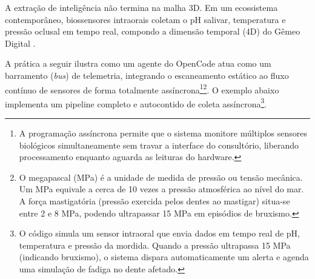 A extração de inteligência não termina na malha 3D. Em um ecossistema contemporâneo, biossensores intraorais coletam o pH salivar, temperatura e pressão oclusal em tempo real, compondo a dimensão temporal (4D) do Gêmeo Digital \cite{Khoshfekr2025}.

A prática a seguir ilustra como um agente do OpenCode atua como um barramento (\textit{bus}) de telemetria, integrando o escaneamento estático ao fluxo contínuo de sensores de forma totalmente assíncrona\footnote{A programação assíncrona permite que o sistema monitore múltiplos sensores biológicos simultaneamente sem travar a interface do consultório, liberando processamento enquanto aguarda as leituras do hardware.}\footnote{O megapascal (MPa) é a unidade de medida de pressão ou tensão mecânica. Um MPa equivale a cerca de 10 vezes a pressão atmosférica ao nível do mar. A força mastigatória (pressão exercida pelos dentes ao mastigar) situa-se entre 2 e 8 MPa, podendo ultrapassar 15 MPa em episódios de bruxismo.}. O exemplo abaixo implementa um pipeline completo e autocontido de coleta assíncrona\footnote{O código simula um sensor intraoral que envia dados em tempo real de pH, temperatura e pressão da mordida. Quando a pressão ultrapassa 15 MPa (indicando bruxismo), o sistema dispara automaticamente um alerta e agenda uma simulação de fadiga no dente afetado.}.

